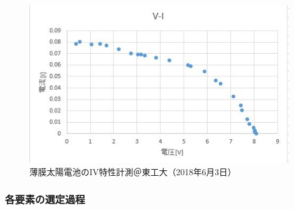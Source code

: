 \begin{figure}[h]
			\centering
			\includegraphics[width=.5\textwidth]{03/fig/3-9-3-14.jpg}
	\caption{薄膜太陽電池のIV特性計測＠東工大（2018年6月3日）}
	\label{fig3-9-3-14}
\end{figure}

\subsubsection*{各要素の選定過程}
